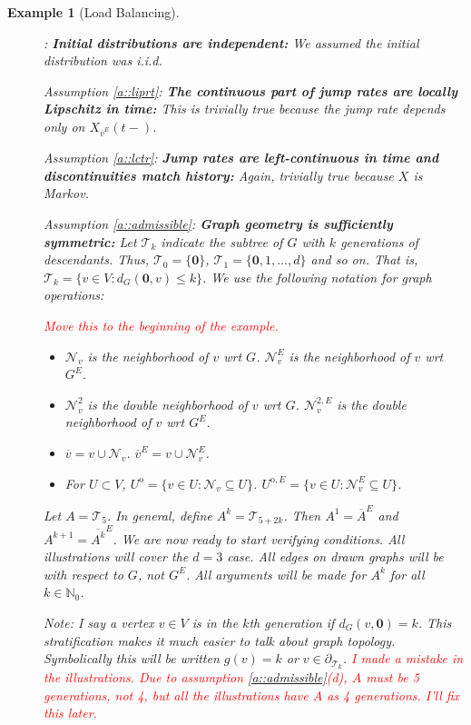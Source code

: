 \documentclass[12pt]{article}
\newcommand{\mb}{\mathbb}
\newcommand{\mc}{\mathcal}
\newcommand{\ov}{\overline}
\newcommand{\tr}{\textcolor{red}}
\newcommand{\ind}{\hspace{24pt}}
\newcommand{\neigh}[1]{\mc{N}_{#1}}				%
\newcommand{\dneigh}[1]{\mc{N}^2_{#1}}			%
\newcommand{\cl}[1]{\ov{#1}}						%
\newcommand{\bdry}[1]{\partial_{#1}}				%
\renewcommand{\root}{\mathbf{0}}					%
\newcommand{\indx}[1]{^{#1}}						%
\newcommand{\Xf}{X}									%
\newcommand{\vind}[1]{_{#1}}						%
\newcommand{\tme}[1]{(#1)}							%
\renewcommand{\d}{d}								%
\newcommand{\eneigh}[1]{\mc{N}^E_{#1}}				%
\newcommand{\deneigh}[1]{\mc{N}^{2,E}_{#1}}			%
\newcommand{\ecl}[1]{\ov{#1}^E}						%
\newcommand{\einte}[1]{{#1}^{\mathrm{o},E}}			%
\newcommand{\tree}[1]{\mc{T}_{#1}}					%
\newcommand{\inte}[1]{{#1}^\mathrm{o}}				%
\newtheorem{example}[thms]{Example}
\begin{document}
\begin{example}[Load Balancing]
\begin{description}
\item[] \cite[Assumption \ref{F-CI::indinit}]{F}: \textbf{Initial distributions are independent:} We assumed the initial distribution was i.i.d.

\item[] Assumption \ref{a::liprt}: \textbf{The continuous part of jump rates are locally Lipschitz in time:} This is trivially true because the jump rate depends only on \(\Xf\vind{\ecl{v}}\tme{t-}\).

\item[] Assumption \ref{a::lctr}: \textbf{Jump rates are left-continuous in time and discontinuities match history:} Again, trivially true because \(\Xf\) is Markov.

\item[] Assumption \ref{a::admissible}: \textbf{Graph geometry is sufficiently symmetric:} Let \(\tree{k}\) indicate the subtree of \(G\) with \(k\) generations of descendants. Thus, \(\tree{0} = \{\root\}\), \(\tree{1} = \{\root,1,\dots,d\}\) and so on. That is, \(\tree{k} = \{v \in V: d_G(\root,v) \leq k\}\). We use the following notation for graph operations:

\tr{Move this to the beginning of the example.}

\begin{itemize}
\item \(\neigh{v}\) is the neighborhood of \(v\) wrt \(G\). \(\eneigh{v}\) is the neighborhood of \(v\) wrt \(G^E\).

\item \(\dneigh{v}\) is the double neighborhood of \(v\) wrt \(G\). \(\deneigh{v}\) is the double neighborhood of \(v\) wrt \(G^E\).

\item \(\cl{v} = v\cup \neigh{v}\). \(\ecl{v} = v\cup\eneigh{v}\).

\item For \(U \subset V\), \(\inte{U} = \{v \in U: \neigh{v}\subseteq U\}\). \(\einte{U} = \{v \in U: \eneigh{v}\subseteq U\}\).
\end{itemize}

Let \(A = \tree{5}\). In general, define \(A\indx{k} = \tree{5+2k}\). Then \(A\indx{1} = \ecl{A}\) and \(A\indx{k+1} = \ecl{A\indx{k}}\). We are now ready to start verifying conditions. All illustrations will cover the \(\d = 3\) case. All edges on drawn graphs will be with respect to \(G\), not \(G^E\). All arguments will be made for \(A\indx{k}\) for all \(k \in \mb{N}_0\).

\ind Note: I say a vertex \(v\in V\) is in the \(k\)th generation if \(d_G(v,\root) = k\). This stratification makes it much easier to talk about graph topology. Symbolically this will be written \(g(v) = k\) or \(v \in \bdry{\tree{k}}\). \tr{I made a mistake in the illustrations. Due to assumption \ref{a::admissible}(d), \(A\) must be 5 generations, not 4, but all the illustrations have \(A\) as 4 generations. I'll fix this later.}


\end{description}
\end{example}
\end{document}

